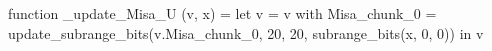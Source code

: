 function _update_Misa_U (v, x) = let v = { v with Misa_chunk_0 = update_subrange_bits(v.Misa_chunk_0, 20, 20, subrange_bits(x, 0, 0)) } in
  v
